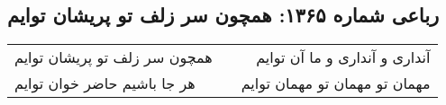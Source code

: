 \begin{center}
\section*{رباعی شماره ۱۳۶۵: همچون سر زلف تو پریشان توایم}
\label{sec:1365}
\begin{longtable}{l p{0.5cm} r}
همچون سر زلف تو پریشان توایم
&&
آنداری و آنداری و ما آن توایم
\\
هر جا باشیم حاضر خوان توایم
&&
مهمان تو مهمان تو مهمان توایم
\\
\end{longtable}
\end{center}
